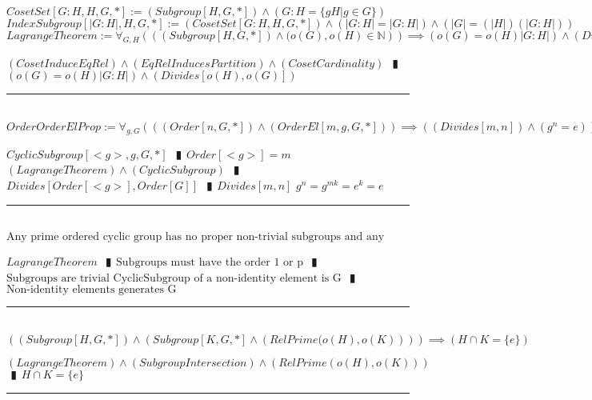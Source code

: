 \documentclass{book}
\newcommand{\abr}{:=}
\newcommand{\pipe}{$\phantom{(}\vrectangleblack\phantom{)}$}
\newcommand{\pr}[1]{\left(#1\right)}
\begin{document}
$CosetSet[G : H, H, G, *] \abr (Subgroup[H, G, *]) \land (G : H = \{g H | g \in G\})$ \\ %
$IndexSubgroup[|G : H|, H, G, *] \abr (CosetSet[G : H, H, G, *]) \land (|G : H| = |G : H|) \land \pr{|G| = (|H|) (|G : H|)}$ \\

$LagrangeTheorem \abr \forall_{G, H}\pr{\pr{(Subgroup[H, G, *]) \land (o(G), o(H) \in \mathbb{N}}} \implies \pr{o(G) = o(H) |G: H|} \land \pr{Divides[o(H), o(G)]}$
\begin{enumerate}
  \lit $(CosetInduceEqRel) \land (EqRelInducesPartition) \land (CosetCardinality)$ \pipe $\pr{o(G) = o(H) |G: H|} \land \pr{Divides[o(H), o(G)]}$
\end{enumerate} \vspace{.75mm} \hrule \vspace{.75mm} \ \\ 

$OrderOrderElProp \abr \forall_{g, G}\pr{\pr{(Order[n, G, *]) \land (OrderEl[m, g, G, *])} \implies \pr{(Divides[m, n]) \land (g^n = e)}}$
\begin{enumerate}
  \lit $CyclicSubgroup[<g>, g, G, *]$ \pipe $Order[<g>] = m$
  \lit $(LagrangeTheorem) \land (CyclicSubgroup)$ \pipe $Divides[Order[<g>], Order[G]]$ \pipe $Divides[m, n]$
  \lit $g^n = g^{m k} = e ^k = e$
\end{enumerate} \vspace{.75mm} \hrule \vspace{.75mm} \ \\ 

$\text{Any prime ordered cyclic group has no proper non-trivial subgroups and any non-identity element is a generator.}$
\begin{enumerate}
  \lit $LagrangeTheorem$ \pipe $\text{Subgroups must have the order 1 or p}$ \pipe $\text{Subgroups are trivial}$
  \lit $\text{CyclicSubgroup of a non-identity element is G}$ \pipe $\text{Non-identity elements generates G}$
\end{enumerate} \vspace{.75mm} \hrule \vspace{.75mm} \ \\ 

$\pr{(Subgroup[H, G, *]) \land \pr{Subgroup[K, G, *] \land \pr{RelPrime(o(H), o(K)}}} \implies (H \cap K = \{e\})$
\begin{enumerate}
  \lit $(LagrangeTheorem) \land (SubgroupIntersection) \land \pr{RelPrime\pr{o(H), o(K)}}$ \pipe $H \cap K = \{e\}$
\end{enumerate} \vspace{.75mm} \hrule \vspace{.75mm} \ \\ 
\end{document}
